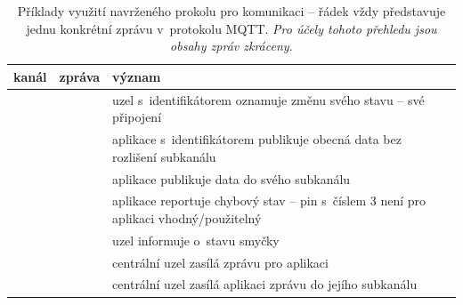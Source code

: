 \begin{table}
    \centering
    \caption{Příklady využití navrženého prokolu pro komunikaci -- řádek vždy představuje jednu konkrétní zprávu
    v~protokolu MQTT. \textit{Pro účely tohoto přehledu jsou obsahy zpráv zkráceny.}}
    \begin{tabularx}{\textwidth}{@{}sls@{}}
        \toprule
        \textbf{kanál} & \textbf{zpráva} & \textbf{význam} \\
        \hline
         &  & uzel s~identifikátorem  oznamuje změnu
        svého stavu -- své připojení \\
        \midrule
         &  & aplikace s~identifikátorem  publikuje
        obecná data bez rozlišení subkanálu \\
        \midrule
         &  & aplikace publikuje data do svého
        subkanálu  \\
        \midrule
         &  & aplikace reportuje chybový
        stav -- pin s~číslem 3 není pro aplikaci vhodný/použitelný \\
        \midrule
         &  & uzel informuje o~stavu
        smyčky\footnotemark \\
        \midrule
         &  & centrální uzel zasílá zprávu pro aplikaci
         \\
        \midrule
         &  & centrální uzel zasílá aplikaci
         zprávu do jejího subkanálu  \\
        \bottomrule
    \end{tabularx}
    \label{table:protocol-examples}
\end{table}

